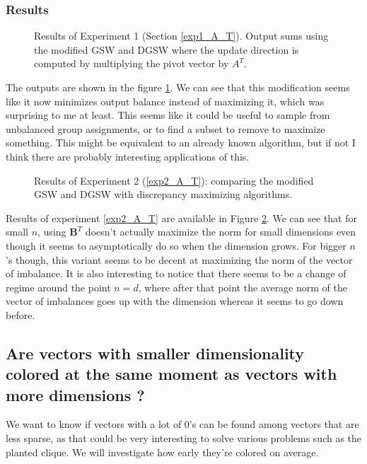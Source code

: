 \documentclass[12pt]{article}
\begin{document}
\subsubsection{Results}
\begin{figure}[h]
\centering

\caption{Results of Experiment 1 (Section \ref{exp1_A_T}). Output sums using the modified GSW and DGSW where the update direction is computed by multiplying the pivot vector by $A^T$.}
\label{A_T_instead_of_lstsq}
\end{figure}
The outputs are shown in the figure \ref{A_T_instead_of_lstsq}. We can see that this modification seems like it now minimizes output balance instead of maximizing it, which was surprising to me at least. This seems like it could be useful to sample from unbalanced group assignments, or to find a subset to remove to maximize something. This might be equivalent to an already known algorithm, but if not I think there are probably interesting applications of this.

\begin{figure}[h]
\centering

\caption{Results of Experiment 2 (\ref{exp2_A_T}): comparing the modified GSW and DGSW with discrepancy maximizing algorithms.}
\label{A_T_instead_of_lstsq_2}
\end{figure}
Results of experiment \ref{exp2_A_T} are available in Figure \ref{A_T_instead_of_lstsq_2}. We can see that for small $n$, using $\textbf{B}^T$ doesn't actually maximize the norm for small dimensions even though it seems to asymptotically do so when the dimension grows. For bigger $n$'s though, this variant seems to be decent at maximizing the norm of the vector of imbalance. It is also interesting to notice that there seems to be a change of regime around the point $n=d$, where after that point the average norm of the vector of imbalances goes up with the dimension whereas it seems to go down before.

\subsection{Are vectors with smaller dimensionality colored at the same moment as vectors with more dimensions ?}\label{smaller_dimensionality}
We want to know if vectors with a lot of 0's can be found among vectors that are less sparse, as that could be very interesting to solve various problems such as the planted clique. We will investigate how early they're colored on average.
\end{document}
